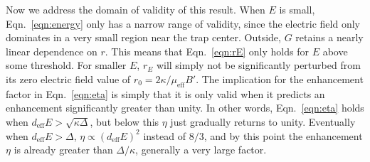 \documentclass[%
 reprint,
 amsmath,amssymb,
 aps,
pra,
]{revtex4-1}
\begin{document}
Now we address the domain of validity of this result. 
When $E$ is small, Eqn.~\ref{eqn:energy} only has a narrow range of validity, since the electric field only dominates in a very small region near the trap center. 
Outside, $G$ retains a nearly linear dependence on $r$. 
This means that Eqn.~\ref{eqn:rE} only holds for $E$ above some threshold. 
For smaller $E$, $r_E$ will simply not be significantly perturbed from its zero electric field value of $r_0=2\kappa/\mu_\text{eff}B'$.
The implication for the enhancement factor in Eqn.~\ref{eqn:eta} is simply that it is only valid when it predicts an enhancement significantly greater than unity.
In other words, Eqn.~\ref{eqn:eta} holds when $d_\text{eff}E>\sqrt{\kappa\Delta}$, but below this $\eta$ just gradually returns to unity.
Eventually when $d_\text{eff}E>\Delta$, $\eta\propto (d_\text{eff}E)^2$ instead of $8/3$, and by this point the enhancement $\eta$ is already greater than $\Delta/\kappa$, generally a very large factor.




\end{document}
